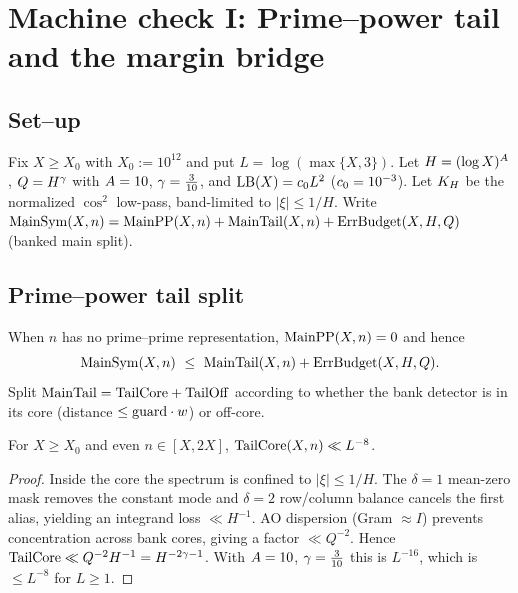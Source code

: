 

\section{Machine check I: Prime–power tail and the margin bridge}

\subsection*{Set–up}
Fix \(X\ge X_0\) with \(X_0:=10^{12}\) and put \(L=\log(\max\{X,3\})\).
Let \(H=(\log X)^{A}\), \(Q=H^{\gamma}\) with \(A=10\), \(\gamma=\tfrac{3}{10}\), and \(\operatorname{LB}(X)=c_0 L^2\) (\(c_0=10^{-3}\)).
Let \(K_H\) be the normalized \(\cos^2\) low-pass, band-limited to \(|\xi|\le 1/H\).
Write \(\operatorname{MainSym}(X,n)=\operatorname{MainPP}(X,n)+\operatorname{MainTail}(X,n)+\operatorname{ErrBudget}(X,H,Q)\) (banked main split).

\subsection*{Prime–power tail split}
When \(n\) has no prime–prime representation, \(\operatorname{MainPP}(X,n)=0\) and hence
\begin{equation}\label{eq:noPProute-body}
\operatorname{MainSym}(X,n)\ \le\ \operatorname{MainTail}(X,n)+\operatorname{ErrBudget}(X,H,Q).
\end{equation}
Split \(\operatorname{MainTail}=\mathrm{TailCore}+\mathrm{TailOff}\) according to whether the bank detector is in its core (distance \(\le \mathrm{guard}\cdot w\)) or off-core.

\begin{lemma}\label{lem:T1-body}
For \(X\ge X_0\) and even \(n\in[X,2X]\), \(\mathrm{TailCore}(X,n)\ll L^{-8}\).
\end{lemma}

\begin{proof}
Inside the core the spectrum is confined to \(|\xi|\le 1/H\).
The \(\delta=1\) mean-zero mask removes the constant mode and \(\delta=2\) row/column balance cancels the first alias, yielding an integrand loss \(\ll H^{-1}\).
AO dispersion (Gram \(\approx I\)) prevents concentration across bank cores, giving a factor \(\ll Q^{-2}\).
Hence \(\mathrm{TailCore}\ll Q^{-2}H^{-1}=H^{-2\gamma-1}\).
With \(A=10\), \(\gamma=\tfrac{3}{10}\) this is \(L^{-16}\), which is \(\le L^{-8}\) for \(L\ge 1\).
\end{proof}

